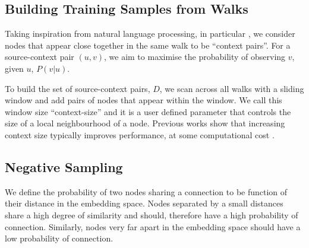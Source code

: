 \documentclass{article}
\begin{document}
\subsection{Building Training Samples from Walks}
Taking inspiration from natural language processing, in particular \cite{mikolov2013efficient,mikolov2013distributed}, we consider nodes that appear close together in the same walk to be ``context pairs''. For a source-context pair $(u,v)$, we aim to maximise the probability of observing $v$, given $u$, $P(v|u)$.

To build the set of source-context pairs, $D$, we scan across all walks with a sliding window and add pairs of nodes that appear within the window. We call this window size ``context-size'' and it is a user defined parameter that controls the size of a local neighbourhood of a node. Previous works show that increasing context size typically improves performance, at some computational cost \cite{grover2016node2vec}. 



\subsection{Negative Sampling}

We define the probability of two nodes sharing a connection to be function of their distance in the embedding space. Nodes separated by a small distances share a high degree of similarity and should, therefore have a high probability of connection. Similarly, nodes very far apart in the embedding space should have a low probability of connection. 
\end{document}
